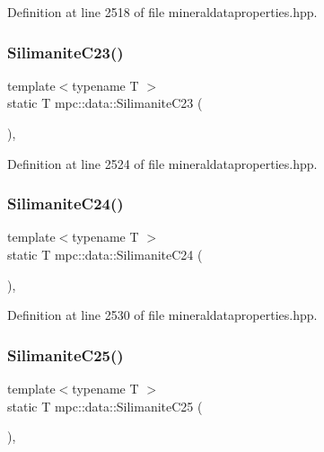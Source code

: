 Definition at line 2518 of file mineraldataproperties.\+hpp.

\mbox{\label{namespacempc_1_1data_a0630c892166ecad27afc5a33ba5b9b42}} 
\subsubsection{\texorpdfstring{Silimanite\+C23()}{SilimaniteC23()}}
{\footnotesize\ttfamily template$<$typename T $>$ \\
static T mpc\+::data\+::\+Silimanite\+C23 (\begin{DoxyParamCaption}{ }\end{DoxyParamCaption})\hspace{0.3cm}{\ttfamily [inline]}, {\ttfamily [static]}}



Definition at line 2524 of file mineraldataproperties.\+hpp.

\mbox{\label{namespacempc_1_1data_aa6c36703d055d6dc7801f66055b8431b}} 
\subsubsection{\texorpdfstring{Silimanite\+C24()}{SilimaniteC24()}}
{\footnotesize\ttfamily template$<$typename T $>$ \\
static T mpc\+::data\+::\+Silimanite\+C24 (\begin{DoxyParamCaption}{ }\end{DoxyParamCaption})\hspace{0.3cm}{\ttfamily [inline]}, {\ttfamily [static]}}



Definition at line 2530 of file mineraldataproperties.\+hpp.

\mbox{\label{namespacempc_1_1data_a45e64631c39ec67b27879cc7e0498912}} 
\subsubsection{\texorpdfstring{Silimanite\+C25()}{SilimaniteC25()}}
{\footnotesize\ttfamily template$<$typename T $>$ \\
static T mpc\+::data\+::\+Silimanite\+C25 (\begin{DoxyParamCaption}{ }\end{DoxyParamCaption})\hspace{0.3cm}{\ttfamily [inline]}, {\ttfamily [static]}}



